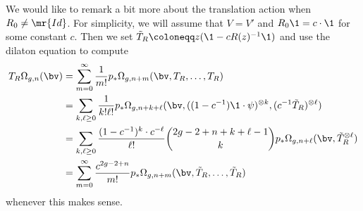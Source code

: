We would like to remark a bit more about the translation action when $R_0 \neq \mr{Id}$. For simplicity, we will assume that $V = V'$ and $R_0 \1 = c \cdot \1$ for some constant $c$. Then we set $\tilde{T}_R \coloneqq z( \1 - c R(z)^{-1} \1)$ and use the dilaton equation to compute
\begin{align*}
    T_R \Omega_{g,n}(\bv) &= \sum_{m=0}^{\infty} \frac{1}{m!} p_*\Omega_{g,n+m}(\bv, T_R, \ldots, T_R) \\
    &= \sum_{k,\ell \geq 0} \frac{1}{k!\ell!} p_* \Omega_{g,n+k+\ell}(\bv, ( (1-c^{-1})\1 \cdot \psi )^{\otimes k}, ( c^{-1} \tilde{T}_R )^{\otimes \ell}) \\
    &= \sum_{k,\ell \geq 0} \frac{(1-c^{-1})^k \cdot c^{-\ell}}{\ell!} \binom{2g-2+n+k+\ell-1}{k} p_* \Omega_{g,n+\ell}(\bv, \tilde{T}_R^{\otimes \ell}) \\
    &= \sum_{m=0}^{\infty} \frac{c^{2g-2+n}}{m!} p_* \Omega_{g,n+m}(\bv, \tilde{T}_R, \ldots, \tilde{T}_R)
\end{align*}
whenever this makes sense.


